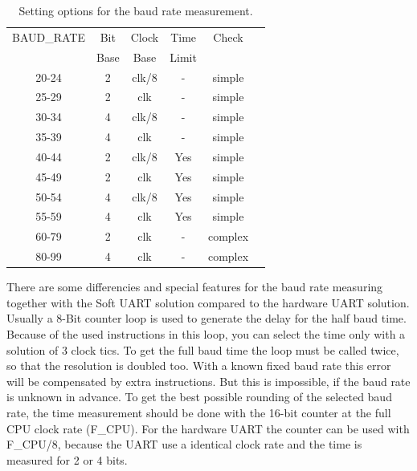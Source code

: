 \begin{table}[H]
  \begin{center}
    \begin{tabular}{| c | c | c | c | c | c |}
    \hline
   BAUD\_RATE  & Bit    & Clock  & Time  & Check \\
               & Base  & Base & Limit &       &  \\
    \hline
    \hline
    20-24      &  2     & clk/8 &   -  & simple \\
    \hline
    25-29      &  2     &  clk  &   -  & simple \\
    \hline
    30-34      &  4     & clk/8 &   -  & simple  \\
    \hline
    35-39      &  4     &  clk  &   -  & simple  \\
    \hline
    40-44      &  2     & clk/8 &   Yes  & simple \\
    \hline
    45-49      &  2     &  clk  &   Yes  & simple \\
    \hline
    50-54      &  4     & clk/8 &   Yes  & simple  \\
    \hline
    55-59      &  4     &  clk  &   Yes  & simple  \\
    \hline
    60-79      &  2     &  clk  &   -  & complex \\
    \hline
    80-99      &  4     &  clk &   -  & complex \\
    \hline
    \end{tabular}
  \end{center}
  \caption{Setting options for the baud rate measurement.}
  \label{tab:AutoBaudControl}
\end{table}


There are some differencies and special features for the baud rate measuring
together with the Soft UART solution compared to the hardware UART solution.
Usually a 8-Bit counter loop is used to generate the delay for the half baud time.
Because of the used instructions in this loop, you can select the time
only with a solution of 3 clock tics.
To get the full baud time the loop must be called twice, so that
the resolution is doubled too.
With a known fixed baud rate this error will be compensated by extra instructions.
But this is impossible, if the baud rate  is unknown in advance.
To get the best possible rounding of the selected baud rate,
the time measurement should be done with the 16-bit counter at the full CPU clock rate (F\_CPU).
For the hardware UART the counter can be used with F\_CPU/8, because the UART
use a identical clock rate and the time is measured for 2 or 4 bits.

